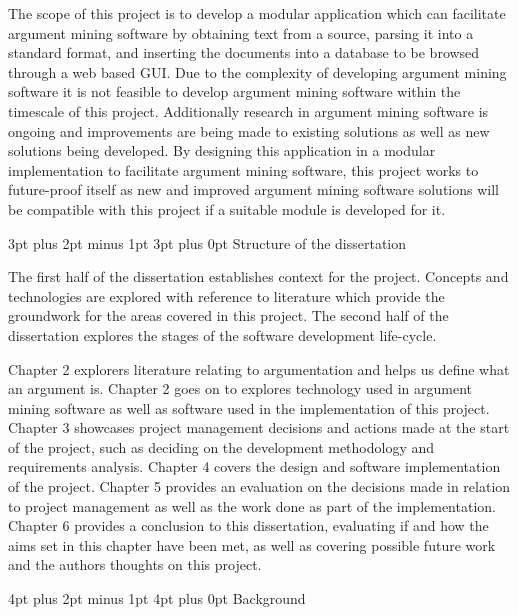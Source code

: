 \documentclass[12pt,a4paper]{article}
\makeatletter
\renewcommand\subsection{\@startsection {subsection}{1}{2mm} %
                               {3pt plus 2pt minus 1pt} %
                               {3pt plus 0pt} %
                               {\normalfont\bfseries}}
\renewcommand\section{\@startsection {section}{1}{0mm} %
                               {4pt plus 2pt minus 1pt} %
                               {4pt plus 0pt} %
                               {\bfseries}}
\makeatother
\begin{document}
The scope of this project is to develop a modular application which can facilitate argument mining software by obtaining text from a source, parsing it into a standard format, and inserting the documents into a database to be browsed through a web based GUI. Due to the complexity of developing argument mining software it is not feasible to develop argument mining software within the timescale of this project. Additionally research in argument mining software is ongoing and improvements are being made to existing solutions as well as new solutions being developed. By designing this application in a modular implementation to facilitate argument mining software, this project works to future-proof itself as new and improved argument mining software solutions will be compatible with this project if a suitable module is developed for it.

\subsection{Structure of the dissertation}

The first half of the dissertation establishes context for the project. Concepts and technologies are explored with reference to literature which provide the groundwork for the areas covered in this project. The second half of the dissertation explores the stages of the software development life-cycle.

Chapter 2 explorers literature relating to argumentation and helps us define what an argument is. Chapter 2 goes on to explores technology used in argument mining software as well as software used in the implementation of this project. Chapter 3 showcases project management decisions and actions made at the start of the project, such as deciding on the development methodology and requirements analysis. Chapter 4 covers the design and software implementation of the project. Chapter 5 provides an evaluation on the decisions made in relation to project management as well as the work done as part of the implementation. Chapter 6 provides a conclusion to this dissertation, evaluating if and how the aims set in this chapter have been met, as well as covering possible future work and the authors thoughts on this project.

\newpage


\section{Background}
\end{document}
